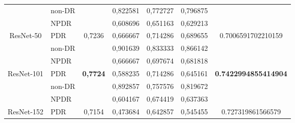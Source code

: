 \begin{table}[hbtp]
\begin{center}
\begin{tabular}{|c|l|c|l|l|l|c|}
			& non-DR                                             &                          & 0,822581                                          & 0,772727                                         & 0,796875                                        &                                      \\ \cline{2-2} \cline{4-6}
			& NPDR                                               &                          & 0,608696                                          & 0,651163                                         & 0,629213                                        &                                      \\ \cline{2-2} \cline{4-6}
			\multirow{-3}{*}{ResNet-50}  & PDR                                                & \multirow{-3}{*}{0,7236} & 0,666667                                          & 0,714286                                         & 0,689655                                        & \multirow{-3}{*}{0.7006591702210159} \\ \hline
			& non-DR                                             &                          & 0,901639                                          & 0,833333                                         & 0,866142                                        &                                      \\ \cline{2-2} \cline{4-6}
			& NPDR                                               &                          & 0,666667                                          & 0,697674                                         & 0,681818                                        &                                      \\ \cline{2-2} \cline{4-6}
			\multirow{-3}{*}{ResNet-101} & PDR                                                & \multirow{-3}{*}{\textbf{0,7724}} & 0,588235                                 & 0,714286                                         & 0,645161                                        & \multirow{-3}{*}{\textbf{0.7422994855414904}} \\ \hline
			& non-DR                                             &                          & 0,892857                                          & 0,757576                                         & 0,819672                                        &                                      \\ \cline{2-2} \cline{4-6}
			& NPDR                                               &                          & 0,604167                                          & 0,674419                                         & 0,637363                                        &                                      \\ \cline{2-2} \cline{4-6}
			\multirow{-3}{*}{ResNet-152} & PDR                                                & \multirow{-3}{*}{0,7154} & 0,473684                                          & 0,642857                                         & 0,545455                                        & \multirow{-3}{*}{0.727319861566579}  \\ \hline
		\end{tabular}
	\end{center}
\end{table}

